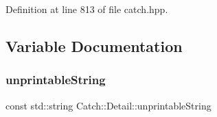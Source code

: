 Definition at line 813 of file catch.\+hpp.



\subsection{Variable Documentation}
\mbox{\label{namespace_catch_1_1_detail_a466775f4eec29ffef29ab334cd885136}} 
\subsubsection{\texorpdfstring{unprintable\+String}{unprintableString}}
{\footnotesize\ttfamily const std\+::string Catch\+::\+Detail\+::unprintable\+String}


